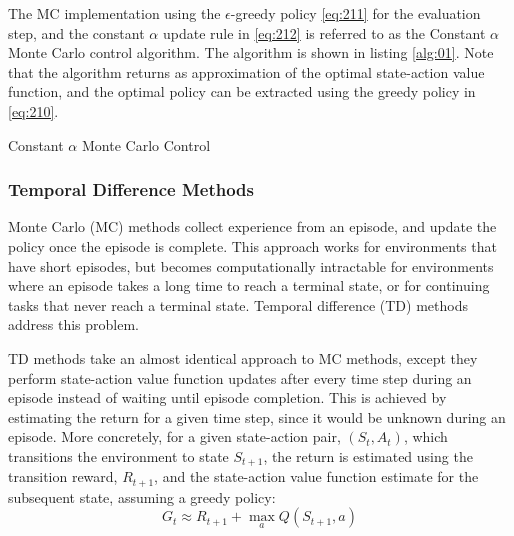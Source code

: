 The MC implementation using the $\epsilon$-greedy policy \ref{eq:211} for the evaluation step, and the constant $\alpha$ update rule in \ref{eq:212} is referred to as the Constant $\alpha$ Monte Carlo control algorithm. The algorithm is shown in listing \ref{alg:01}. Note that the algorithm returns as approximation of the optimal state-action value function, and the optimal policy can be extracted using the greedy policy in \ref{eq:210}.

\begin{algorithm}[h]
	\caption{Constant $\alpha$ Monte Carlo Control}
	\label{alg:01_monte_carlo}
	\begin{algorithmic}[1]
				\EndIf
			\EndFor
		\EndFor
	\end{algorithmic} \label{alg:01}
\end{algorithm}


\subsubsection{Temporal Difference Methods}
Monte Carlo (MC) methods collect experience from an episode, and update the policy once the episode is complete. This approach works for environments that have short episodes, but becomes computationally intractable for environments where an episode takes a long time to reach a terminal state, or for continuing tasks that never reach a terminal state. Temporal difference (TD) methods address this problem.

TD methods take an almost identical approach to MC methods, except they perform state-action value function updates after every time step during an episode instead of waiting until episode completion. This is achieved by estimating the return for a given time step, since it would be unknown during an episode. More concretely, for a given state-action pair, $(S_t, A_t)$, which transitions the environment to state $S_{t+1}$, the return is estimated using the transition reward, $R_{t+1}$, and the state-action value function estimate for the subsequent state, assuming a greedy policy:
\begin{equation}
	G_t \approx R_{t+1} + \max_{a}Q(S_{t+1}, a) \label{eq:213}
\end{equation}

